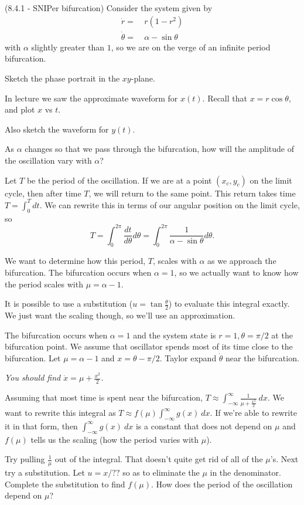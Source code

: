 \documentclass[12pt,letterpaper,noanswers]{exam}
\begin{document}
\begin{questions}
\item (8.4.1 - SNIPer bifurcation) Consider the system given by 
\begin{align*}
\dot{r} = &\ r(1-r^2) \\
\dot{\theta} = &\ \alpha - \sin\theta
\end{align*}
with $\alpha$ slightly greater than $1$, so we are on the verge of an infinite period bifurcation.
\begin{parts}
\item Sketch the phase portrait in the $xy$-plane.
\item In lecture we saw the approximate waveform for $x(t)$.  Recall that $x = r\cos\theta$, and plot $x$ vs $t$.
\item Also sketch the waveform for $y(t)$.
\item As $\alpha$ changes so that we pass through the bifurcation, how will the amplitude of the oscillation vary with $\alpha$?
\item Let $T$ be the period of the oscillation.  If we are at a point $(x_c, y_c)$ on the limit cycle, then after time $T$, we will return to the same point.  This return takes time $T = \int_0^T dt$.  We can rewrite this in terms of our angular position on the limit cycle, so \[T = \int_0^{2\pi} \frac{dt}{d\theta}d\theta = \int_0^{2\pi} \frac{1}{\alpha-\sin\theta}d\theta.\]

We want to determine how this period, $T$, scales with $\alpha$ as we approach the bifurcation.  The bifurcation occurs when $\alpha = 1$, so we actually want to know how the period scales with $\mu = \alpha - 1$.

It is possible to use a substitution ($u = \tan \frac{\theta}{2}$) to evaluate this integral exactly.  We just want the scaling though, so we'll use an approximation.

The bifurcation occurs when $\alpha = 1$ and the system state is $r = 1, \theta = \pi/2$ at the bifurcation point.  We assume that oscillator spends most of its time close to the bifurcation.  Let $\mu = \alpha -1$ and $x = \theta - \pi/2$.  Taylor expand $\dot{\theta}$ near the bifurcation.

\emph{You should find $\dot{x} = \mu + \frac{x^2}{2}$.}

\item Assuming that most time is spent near the bifurcation, $\displaystyle T \approx \int_{-\infty}^{\infty} \frac{1}{\mu + \frac{x^2}{2}}\ dx.$  We want to rewrite this integral as $T\approx f(\mu) \int_{-\infty}^{\infty} g(x) \ dx$.  If we're able to rewrite it in that form, then $\int_{-\infty}^{\infty} g(x) \ dx$ is a constant that does not depend on $\mu$ and $f(\mu)$ tells us the scaling (how the period varies with $\mu$).

Try pulling $\frac{1}{\mu}$ out of the integral.  That doesn't quite get rid of all of the $\mu$'s.  Next try a substitution.  Let $u = x/??$ so as to eliminate the $\mu$ in the denominator.  Complete the substitution to find $f(\mu)$.  How does the period of the oscillation depend on $\mu$?

\end{parts}

\end{questions}
\end{document}
